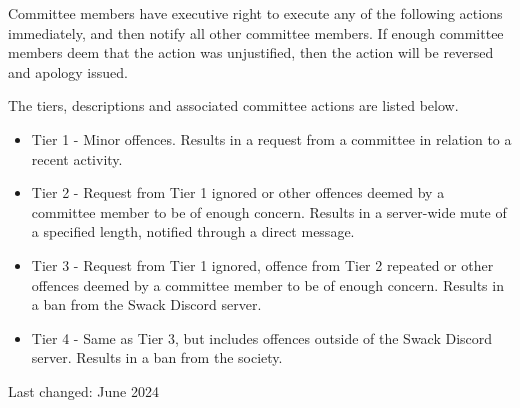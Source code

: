 \documentclass[12pt]{extarticle}
\begin{document}
	Committee members have executive right to execute any of the following actions immediately, and then notify all other committee members. If enough committee members deem that the action was unjustified, then the action will be reversed and apology issued. 
	
	The tiers, descriptions and associated committee actions are listed below.
        \begin{itemize}
	    \item Tier 1 - Minor offences. Results in a request from a committee in relation to a recent activity.
	    \item Tier 2 - Request from Tier 1 ignored or other offences deemed by a committee member to be of enough concern. Results in a server-wide mute of a specified length, notified through a direct message.
	    \item Tier 3 - Request from Tier 1 ignored, offence from Tier 2 repeated or other offences deemed by a committee member to be of enough concern. Results in a ban from the Swack Discord server.
	    \item Tier 4 - Same as Tier 3, but includes offences outside of the Swack Discord server. Results in a ban from the society. 
	\end{itemize}
	    
	\footnotesize Last changed: June 2024
\end{document}
